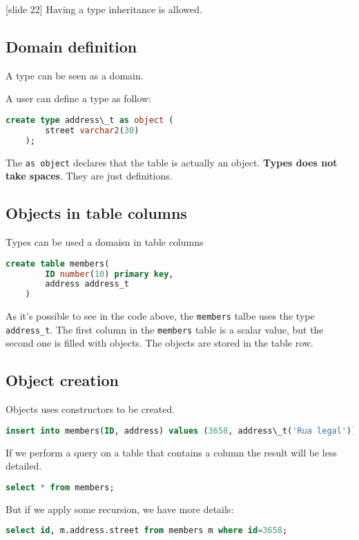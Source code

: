 [slide 22]  Having a type inheritance is allowed.  

\subsection{Domain definition}
A type can be seen as a domain. 

A user can define a type as follow:
\begin{lstlisting}[language=sql]
    create type address\_t as object (
        street varchar2(30)
    );
\end{lstlisting} 

The \texttt{as object} declares that the table is actually an object. 
\textbf{Types does not take spaces}. They are just definitions. 


\subsection{Objects in table columns}
Types can be used a domaisn in table columns
\begin{lstlisting}[language=sql]
    create table members(
        ID number(10) primary key, 
        address address_t
    )
\end{lstlisting} 

As it's possible to see in the code above, the \texttt{members} talbe uses the type \texttt{address\_t}. The first column in the \texttt{members} table is a scalar value, but the second one is filled with objects. The objects are stored in the table row. 

\subsection{Object creation} 

Objects uses constructors to be created. 
\begin{lstlisting}[language=sql]
    insert into members(ID, address) values (3658, address\_t('Rua legal'));
\end{lstlisting} 

If we perform a query on a table that contains a column the result will be less detailed.
\begin{lstlisting}[language=sql]
select * from members; 
\end{lstlisting} 

But if we apply some recursion, we have more details: 

\begin{lstlisting}[language=sql]
    select id, m.address.street from members m where id=3658; 
\end{lstlisting} 


